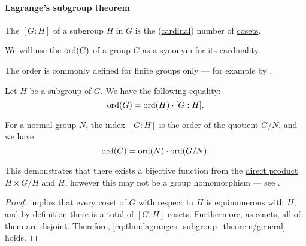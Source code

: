 \paragraph{Lagrange's subgroup theorem}

\begin{definition}\label{def:subgroup_index}
  The  \( [G : H] \) of a subgroup \( H \) in \( G \) is the (\hyperref[def:cardinal]{cardinal}) number of \hyperref[rem:subgroup_cosets]{cosets}.
\end{definition}

\medskip

\begin{definition}\label{def:group_order}\mimprovised
  We will use the  \( \operatorname{ord}(G) \) of a group \( G \) as a synonym for its \hyperref[thm:cardinality_existence]{cardinality}.
\end{definition}
\begin{comments}
  \item The order is commonly defined for finite groups only --- for example by .
\end{comments}

\begin{theorem}\label{thm:lagranges_subgroup_theorem}
  Let \( H \) be a subgroup of \( G \). We have the following equality:
  \begin{equation}\label{eq:thm:lagranges_subgroup_theorem/general}
    \operatorname{ord}(G) = \operatorname{ord}(H) \cdot [G : H].
  \end{equation}

  For a normal group \( N \), the index \( [G : H] \) is the order of the quotient \( G / N \), and we have
  \begin{equation}\label{eq:thm:lagranges_subgroup_theorem/normal}
    \operatorname{ord}(G) = \operatorname{ord}(N) \cdot \operatorname{ord}(G / N).
  \end{equation}
\end{theorem}
\begin{comments}
  \item This demonstrates that there exists a bijective function from the \hyperref[def:first_order_direct_product]{direct product} \( H \times G / H \) and \( H \), however this may not be a group homomorphism --- see .
\end{comments}
\begin{proof}
   implies that every coset of \( G \) with respect to \( H \) is equinumerous with \( H \), and by definition there is a total of \( [G : H] \) cosets. Furthermore, as cosets, all of them are disjoint. Therefore, \eqref{eq:thm:lagranges_subgroup_theorem/general} holds.
\end{proof}

